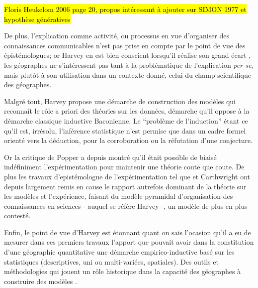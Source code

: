 \hl{Floris Heukelom 2006 page 20, propos intéressant à ajouter sur SIMON 1977 et hypothèse génératives}

De plus, l'explication comme activité, ou processus en vue d'organiser des connaissances communicables n'est pas prise en compte par le point de vue des épistémologues; or Harvey en est bien conscient lorsqu'il réalise son grand écart \autocite[10]{Harvey1969}, les géographes ne s’intéressent pas tant à la problématique de l'explication \textit{per se}, mais plutôt à son utilisation dans un contexte donné, celui du champ scientifique des géographes.

Malgré tout, Harvey propose une démarche de construction des modèles qui reconnaît le rôle a priori des théories sur les données, démarche qu'il oppose à la démarche classique inductive Baconienne. Le \enquote{problème de l'induction} étant ce qu'il est, irrésolu, l'inférence statistique n'est permise que dans un cadre formel orienté vers la déduction, pour la corroboration ou la réfutation d'une conjecture.


Or la critique de Popper  a depuis montré qu'il était possible de biaisé indéfiniment l'expérimentation pour maintenir une théorie coute que coute. De plus les travaux d'epistémologue de l'expérimentation tel que \textcite[348-351]{Hacking1983} et Carthwright ont depuis largement remis en cause le rapport autrefois dominant de la théorie sur les modèles et l'expérience, faisant du modèle pyramidal d'organisation des connaissances en sciences - auquel se réfère Harvey -, un modèle de plus en plus contesté.

Enfin, le point de vue d'Harvey est étonnant quant on sais l'ocasion qu'il a eu de mesurer dans ces premiers travaux l'apport que pouvait avoir dans la constitution d'une géographie quantitative une démarche empirico-inductive basé sur les statistiques (descriptives, uni ou multi-variées, spatiales). Des outils et méthodologies qui jouent un rôle historique \autocite{Pumain2003,Pumain2002} dans la capacité des géographes à construire des modèles \autocite{Sanders2000, Cottineau2014b}.


